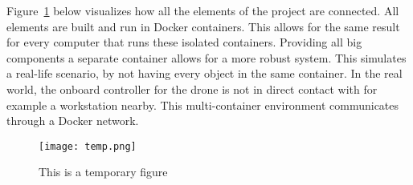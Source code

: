 Figure~\ref{fig:temp} below visualizes how all the elements of the project are connected. All elements are built and run in Docker containers. This allows for the same result for every computer that runs these isolated containers. Providing all big components a separate container allows for a more robust system. This simulates a real\hyp{}life scenario, by not having every object in the same container. In the real world, the onboard controller for the drone is not in direct contact with for example a workstation nearby. This multi\hyp{}container environment communicates through a Docker network.

\begin{figure}[!h]
  \centering
  \texttt{[image: temp.png]}
  \caption{This is a temporary figure}
  \label{fig:temp}
\end{figure}